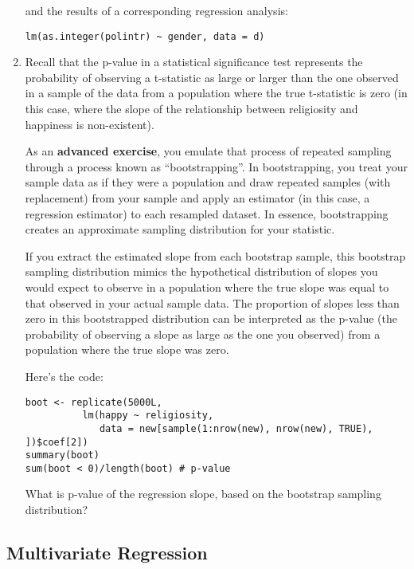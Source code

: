 \documentclass[a4paper,12pt]{article}
\begin{document}
\begin{enumerate}
\noindent and the results of a corresponding regression analysis:

\begin{verbatim}
lm(as.integer(polintr) ~ gender, data = d)
\end{verbatim}

\item Recall that the p-value in a statistical significance test represents the probability of observing a t-statistic as large or larger than the one observed in a sample of the data from a population where the true t-statistic is zero (in this case, where the slope of the relationship between religiosity and happiness is non-existent).

As an \textbf{advanced exercise}, you emulate that process of repeated sampling through a process known as ``bootstrapping''. In bootstrapping, you treat your sample data as if they were a population and draw repeated samples (with replacement) from your sample and apply an estimator (in this case, a regression estimator) to each resampled dataset. In essence, bootstrapping creates an approximate sampling distribution for your statistic.

If you extract the estimated slope from each bootstrap sample, this bootstrap sampling distribution mimics the hypothetical distribution of slopes you would expect to observe in a population where the true slope was equal to that observed in your actual sample data. The proportion of slopes less than zero in this bootstrapped distribution can be interpreted as the p-value (the probability of observing a slope as large as the one you observed) from a population where the true slope was zero.

Here's the code:

\begin{verbatim}
boot <- replicate(5000L, 
          lm(happy ~ religiosity, 
             data = new[sample(1:nrow(new), nrow(new), TRUE), ])$coef[2])
summary(boot)
sum(boot < 0)/length(boot) # p-value
\end{verbatim}

\noindent What is p-value of the regression slope, based on the bootstrap sampling distribution?

\end{enumerate}

\subsection{Multivariate Regression}
\end{document}
